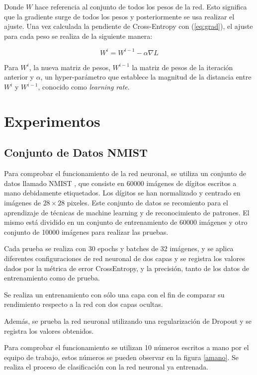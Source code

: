 \documentclass[journal]{IEEEtran}
\begin{document}
Donde $W$ hace referencia al conjunto de todos los pesos de la red. Esto significa que la gradiente surge de todos los pesos y posteriormente se usa realizar el ajuste. Una vez calculada la pendiente de Cross-Entropy con (\ref{eq:grad}), el ajuste para cada peso se realiza de la siguiente manera:

\begin{equation}\label{eq:ajuste}
    W^i = W^{i-1} - \alpha \nabla L
\end{equation}

Para $W^i$, la nueva matriz de pesos, $W^{i-1}$ la matriz de pesos de la iteración anterior y $\alpha$, un hyper-parámetro que establece la magnitud de la distancia entre $W^i$ y \(W^{i-1}\), conocido como \textit{learning rate}.


\section{Experimentos}

\subsection{Conjunto de Datos NMIST}
Para comprobar el funcionamiento de la red neuronal, se utiliza un conjunto de datos llamado NMIST \cite{NMIST}, que consiste en 60000 imágenes de dígitos escritos a mano debidamente etiquetados. Los dígitos se han normalizado y centrado en imágenes de $28 \times 28$ pixeles. Este conjunto de datos se recomiento para el aprendizaje de técnicas de machine learning y de reconocimiento de patrones. El mismo está dividido en un conjunto de entrenamiento de 60000 imágenes y otro conjunto de 10000 imágenes para realizar las pruebas.

Cada prueba se realiza con 30 epochs y batches de 32 imágenes, y se aplica diferentes configuraciones de red neuronal de dos capas y se registra los valores dados por la métrica de error CrossEntropy, y la precisión, tanto de los datos de entrenamiento como de prueba.

Se realiza un entrenamiento con sólo una capa con el fin de comparar su rendimiento respecto a la red con dos capas ocultas.

Además, se prueba la red neuronal utilizando una regularización de Dropout y se registra los valores obtenidos.

Para comprobar el funcionamiento se utilizan 10 números escritos a mano por el equipo de trabajo, estos números se pueden observar en la figura \ref{amano}. Se realiza el proceso de clasificación con la red neuronal ya entrenada.
\end{document}
